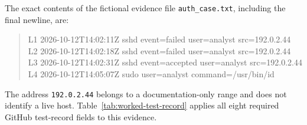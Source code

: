 \documentclass[12pt,letterpaper]{article}
\begin{document}
The exact contents of the fictional evidence file \texttt{auth\_case.txt}, including the final newline, are:
\begin{quote}
    \ttfamily\footnotesize
    L1 2026-10-12T14:02:11Z sshd event=failed user=analyst src=192.0.2.44\\
    L2 2026-10-12T14:02:18Z sshd event=failed user=analyst src=192.0.2.44\\
    L3 2026-10-12T14:02:31Z sshd event=accepted user=analyst src=192.0.2.44\\
    L4 2026-10-12T14:05:07Z sudo user=analyst command=/usr/bin/id
\end{quote}
The address \texttt{192.0.2.44} belongs to a documentation-only range and does not identify a live host. Table~\ref{tab:worked-test-record} applies all eight required GitHub test-record fields to this evidence.
\end{document}
